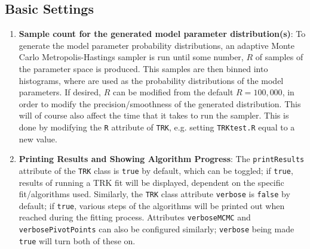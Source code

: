 \documentclass[12pt]{article}
\newcommand{\li}{\lstinline}
\begin{document}
\subsection{Basic Settings}
\label{sec:basicsettings}
\begin{enumerate}
    \item \textbf{Sample count for the generated model parameter distribution(s)}: To generate the model parameter probability distributions, an adaptive Monte Carlo Metropolis-Hastings sampler is run until some number, $R$ of samples of the parameter space is produced. This samples are then binned into histograms, where are used as the probability distributions of the model parameters. If desired, $R$ can be modified from the default $R=100,000$, in order to modify the precision/smoothness of the generated distribution. This will of course also affect the time that it takes to run the sampler. This is done by modifying the \li{R} attribute of \li{TRK}, e.g. setting \li{TRKtest.R} equal to a new value.
    \item \textbf{Printing Results and Showing Algorithm Progress}: The \li{printResults} attribute of the \li{TRK} class is \li{true} by default, which can be toggled; if \li{true}, results of running a TRK fit will be displayed, dependent on the specific fit/algorithms used. Similarly, the \li{TRK} class attribute \li{verbose} is \li{false} by default; if \li{true}, various steps of the algorithms will be printed out when reached during the fitting process. Attributes \li{verboseMCMC} and \li{verbosePivotPoints} can also be configured similarly; \li{verbose} being made \li{true} will turn both of these on.
\end{enumerate}
\end{document}
